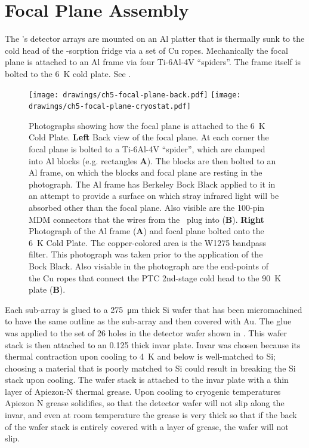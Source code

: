 \section{Focal Plane Assembly} \label{sec:ch5-focal-plane}

The \Imager's detector arrays are mounted on an Al platter that is thermally sunk to the cold head of the -sorption fridge via a set of Cu ropes.
Mechanically the focal plane is attached to an Al frame via four Ti-6Al-4V ``spiders''.
The frame itself is bolted to the \SI{6}{\K} cold plate.
See .

\begin{figure}
\centering
\texttt{[image: drawings/ch5-focal-plane-back.pdf]}
\texttt{[image: drawings/ch5-focal-plane-cryostat.pdf]}
\caption[Photograph of focal plane in cryostat]{
  Photographs showing how the focal plane is attached to the \SI{6}{\K} Cold Plate.
  \textbf{Left}
  Back view of the focal plane.
  At each corner the focal plane is bolted to a Ti-6Al-4V ``spider'', which are clamped into Al blocks (e.g. rectangles \textbf{A}).
  The blocks are then bolted to an Al frame, on which the blocks and focal plane are resting in the photograph.
  The Al frame has Berkeley Bock Black \cite{persky_review_1999} applied to it in an attempt to provide a surface on which stray infrared light will be absorbed other than the focal plane.
  Also visible are the 100-pin MDM connectors that the wires from the \MCE\ plug into (\textbf{B}).
  \textbf{Right}
  Photograph of the Al frame (\textbf{A}) and focal plane bolted onto the \SI{6}{\K} Cold Plate.
  The copper-colored area is the W1275 bandpass filter.
  This photograph was taken prior to the application of the Bock Black.
  Also visiable in the photograph are the end-points of the Cu ropes that connect the PTC 2nd-stage cold head to the \SI{90}{\K} plate (\textbf{B}).
}
\label{fig:ch5-focal-plane-back}
\end{figure}

Each sub-array is glued to a \SI{275}{\um} thick Si wafer that has been micromachined to have the same outline as the sub-array and then covered with Au.
The glue was applied to the set of 26 holes in the detector wafer shown in .
This wafer stack is then attached to an \SI{0.125}{\in} thick invar plate.
Invar was chosen because its thermal contraction upon cooling to \SI{4}{\K} and below is well-matched to Si; choosing a material that is poorly matched to Si could result in breaking the Si stack upon cooling.
The wafer stack is attached to the invar plate with a thin layer of Apiezon-N thermal grease.
Upon cooling to cryogenic temperatures Apiezon N grease solidifies, so that the detector wafer will not slip along the invar, and even at room temperature the grease is very thick so that if the back of the wafer stack is entirely covered with a layer of grease, the wafer will not slip.

